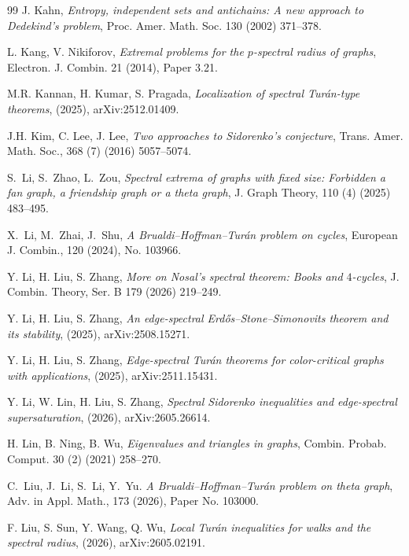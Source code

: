 \documentclass[11pt, a4paper]{article}
\theoremstyle{definition}
\theoremstyle{plain}
\begin{document}
\begin{thebibliography}{99}
J. Kahn,
\emph{Entropy, independent sets and antichains: A  new approach to Dedekind's problem},
{Proc. Amer. Math. Soc.}  {130} (2002) 371--378.

L. Kang, V. Nikiforov,
\emph{Extremal problems for the $p$-spectral radius
of graphs},
{Electron. J. Combin.}  {21} (2014),
Paper 3.21.

M.R. Kannan, H. Kumar, S. Pragada,
\emph{Localization of spectral Tur\'an-type theorems}, (2025),  arXiv:2512.01409. 

J.H. Kim, C. Lee, J. Lee, 
\emph{Two approaches to Sidorenko's conjecture},  Trans. Amer. Math. Soc., 368 (7) (2016) 5057--5074.

S.~Li, S.~Zhao, L.~Zou, 
\emph{Spectral extrema of graphs with fixed size: {Forbidden} a fan graph, a friendship graph or a theta graph}, 
{J. Graph Theory}, 110 (4) (2025) 483--495.


X.~Li, M.~Zhai, J.~Shu, 
\emph{A {Brualdi--Hoffman--Tur\'{a}n} problem on cycles}, 
{European J. Combin.}, 120 (2024), No. 103966.  

Y. Li, H. Liu, S. Zhang,
\emph{More on Nosal's spectral theorem: Books and $4$-cycles},
{J. Combin. Theory, Ser. B} {179} (2026) 219--249.

Y. Li, H. Liu, S. Zhang,
\emph{An edge-spectral Erd\H{o}s--Stone--Simonovits theorem and its stability}, (2025), 
arXiv:2508.15271.

Y. Li, H. Liu, S. Zhang,
\emph{Edge-spectral Tur\'an theorems for color-critical graphs with applications}, (2025), 
arXiv:2511.15431.

 Y. Li, W. Lin, H. Liu, S. Zhang, 
 \emph{Spectral Sidorenko inequalities and 
 edge-spectral supersaturation}, (2026), arXiv:2605.26614.  

H. Lin, B. Ning, B. Wu, 
\emph{Eigenvalues and triangles in graphs}, 
Combin. Probab. Comput. 30 (2) (2021) 258--270.


C.~Liu, J.~Li, S.~Li, Y.~Yu.
\emph{A {Brualdi--Hoffman--Tur\'{a}n} problem on theta graph}, 
{Adv. in Appl. Math.}, 173 (2026), 
Paper No. 103000. 

F. Liu, S. Sun, Y. Wang, Q. Wu,
\emph{Local Tur\'an inequalities for walks and the
spectral radius}, (2026), arXiv:2605.02191.




\end{thebibliography}
\end{document}
